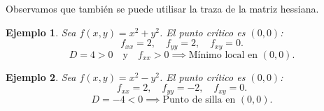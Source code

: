 \documentclass[11pt]{book}
\theoremstyle{definicion}
\theoremstyle{teorema}
\theoremstyle{ejemplo}
\newtheorem{ejemplo}{Ejemplo}[section]
\begin{document}
\noindent Observamos que también se puede utilisar la traza de la matriz hessiana.

\begin{ejemplo}
    Sea \( f(x, y) = x^2 + y^2 \). El punto crítico es \( (0, 0) \):
    \[
    f_{xx} = 2, \quad f_{yy} = 2, \quad f_{xy} = 0.
    \]
    \[
    D = 4 > 0 \quad \text{y} \quad f_{xx} > 0 \implies \text{Mínimo local en } (0, 0).
    \]
\end{ejemplo}

\begin{ejemplo}
    Sea \( f(x, y) = x^2 - y^2 \). El punto crítico es \( (0, 0) \):
    \[
    f_{xx} = 2, \quad f_{yy} = -2, \quad f_{xy} = 0.
    \]
    \[
    D = -4 < 0 \implies \text{Punto de silla en } (0, 0).
    \]
\end{ejemplo}

\end{document}
